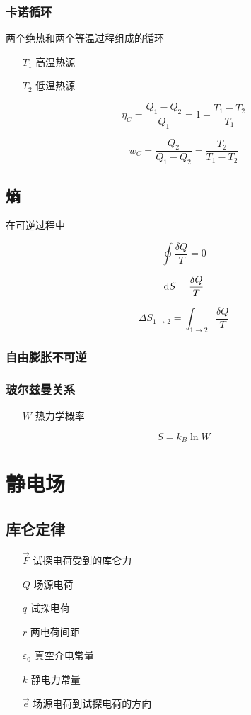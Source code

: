 \documentclass{article}
\begin{document}
\subsubsection{卡诺循环}

两个绝热和两个等温过程组成的循环

\begin{enumerate}
    \item[$T_1$] 高温热源
    \item[$T_2$] 低温热源
\end{enumerate}

\[\eta_C=\frac{Q_1-Q_2}{Q_1}=1-\frac{T_1-T_2}{T_1}\]

\[w_C=\frac{Q_2}{Q_1-Q_2}=\frac{T_2}{T_1-T_2}\]

\subsection{熵}

在可逆过程中

\[\oint\frac{\delta Q}T=0\]

\[\mathrm d S=\frac{\delta Q}T\]

\[\Delta S_{1\to2}=\int_{1\to2}\frac{\delta Q}T\]

\subsubsection{自由膨胀不可逆}

\subsubsection{玻尔兹曼关系}

\begin{enumerate}
    \item[$W$] 热力学概率
\end{enumerate}

\[S=k_B\ln W\]

\section{静电场}

\subsection{库仑定律}

\begin{enumerate}
    \item[$\vec F$] 试探电荷受到的库仑力
    \item[$Q$] 场源电荷
    \item[$q$] 试探电荷
    \item[$r$] 两电荷间距
    \item[$\varepsilon_0$] 真空介电常量
    \item[$k$] 静电力常量
    \item[$\vec e$] 场源电荷到试探电荷的方向
\end{enumerate}
\end{document}

